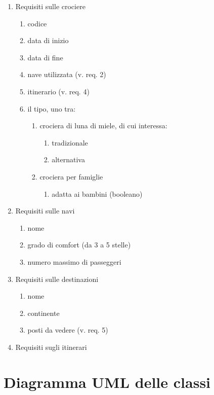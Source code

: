 \documentclass{article}
\begin{document}
\begin{enumerate}
    \item Requisiti sulle crociere
    \begin{enumerate}
        \item codice
        \item data di inizio
        \item data di fine
        \item nave utilizzata (v. req. 2)
        \item itinerario (v. req. 4)
        \item il tipo, uno tra:
        \begin{enumerate}
            \item crociera di luna di miele, di cui interessa:
            \begin{enumerate}
                \item tradizionale
                \item alternativa
            \end{enumerate}
            \item crociera per famiglie
            \begin{enumerate}
                \item adatta ai bambini (booleano)
            \end{enumerate}
        \end{enumerate}
    \end{enumerate}
    \item Requisiti sulle navi
    \begin{enumerate}
        \item nome
        \item grado di comfort (da 3 a 5 stelle)
        \item numero massimo di passeggeri
    \end{enumerate}
    \item Requisiti sulle destinazioni
    \begin{enumerate}
        \item nome
        \item continente
        \item posti da vedere (v. req. 5)
    \end{enumerate}
    \item Requisiti sugli itinerari
\end{enumerate}


\section{Diagramma UML delle classi}
\end{document}
